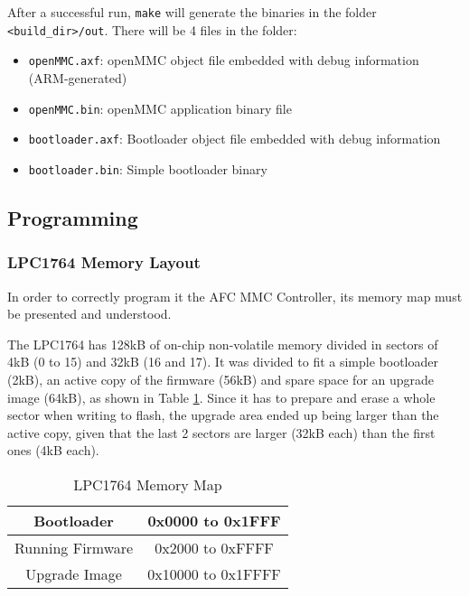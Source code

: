 \documentclass[letterpaper,12pt, titlepage]{article}
\begin{document}
After a successful run, \texttt{make} will generate the binaries in the folder \texttt{<build\_dir>/out}. There will be 4 files in the folder:
\begin{itemize}
  \setlength\itemsep{0em}
\item\texttt{openMMC.axf}: openMMC object file embedded with debug information (ARM-generated)
\item\texttt{openMMC.bin}: openMMC application binary file
\item\texttt{bootloader.axf}: Bootloader object file embedded with debug information
\item\texttt{bootloader.bin}: Simple bootloader binary
\end{itemize}

\subsection{Programming}

\subsubsection{LPC1764 Memory Layout}
In order to correctly program it the AFC MMC Controller, its memory map must be presented and understood.

The LPC1764 has 128kB of on-chip non-volatile memory divided in sectors of 4kB (0 to 15) and 32kB (16 and 17). It was divided to fit a simple bootloader (2kB), an active copy of the firmware (56kB) and spare space for an upgrade image (64kB), as shown in Table \ref{tbl:lpc-memory-map}. Since it has to prepare and erase a whole sector when writing to flash, the upgrade area ended up being larger than the active copy, given that the last 2 sectors are larger (32kB each) than the first ones (4kB each).

\begin{table}[ht]
  \begin{center}
    \caption{LPC1764 Memory Map}
    \label{tbl:lpc-memory-map}
    \begin{tabular}{|c|c|}
      \hline
      Bootloader & 0x0000 to 0x1FFF\\
      \hline
      Running Firmware & 0x2000 to 0xFFFF\\
      \hline
      Upgrade Image & 0x10000 to 0x1FFFF\\
      \hline
    \end{tabular}
  \end{center}
\end{table}
\end{document}
